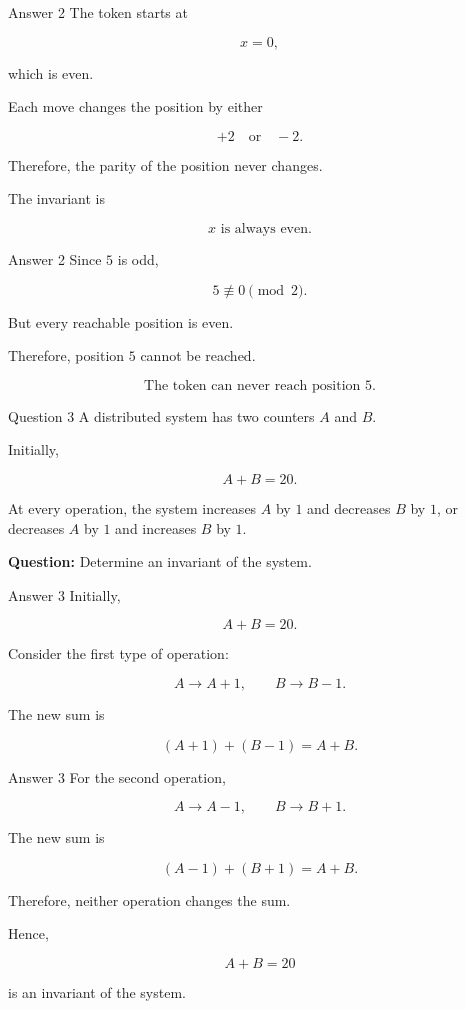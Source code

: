 \begin{frame}{Answer 2}
The token starts at

$$
x=0,
$$

which is even.

Each move changes the position by either

$$
+2
\quad\text{or}\quad
-2.
$$

Therefore, the parity of the position never changes.

The invariant is

$$
\boxed{x\text{ is always even}.}
$$

\end{frame}

\begin{frame}{Answer 2}
Since $5$ is odd,

$$
5\not\equiv0\pmod 2.
$$

But every reachable position is even.

Therefore, position $5$ cannot be reached.

$$
\boxed{\text{The token can never reach position }5.}
$$

\end{frame}


\begin{frame}{Question 3}
A distributed system has two counters $A$ and $B$.

Initially,

$$
A+B=20.
$$

At every operation, the system increases $A$ by $1$ and decreases $B$ by $1$, or decreases $A$ by $1$ and increases $B$ by $1$.

\textbf{Question:} Determine an invariant of the system.
\end{frame}

\begin{frame}{Answer 3}
Initially,

$$
A+B=20.
$$

Consider the first type of operation:

$$
A\rightarrow A+1,
\qquad
B\rightarrow B-1.
$$

The new sum is

$$
(A+1)+(B-1)=A+B.
$$

\end{frame}

\begin{frame}{Answer 3}
For the second operation,

$$
A\rightarrow A-1,
\qquad
B\rightarrow B+1.
$$

The new sum is

$$
(A-1)+(B+1)=A+B.
$$

Therefore, neither operation changes the sum.

Hence,

$$
\boxed{A+B=20}
$$

is an invariant of the system.
\end{frame}

